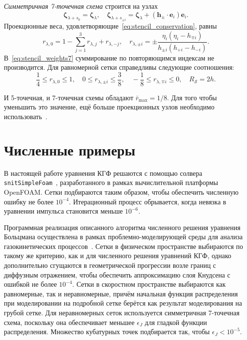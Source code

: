 \documentclass[
aps,%
12pt,%
final,%
notitlepage,%
oneside,%
onecolumn,%
nobibnotes,%
nofootinbib,%
superscriptaddress,%
noshowpacs,%
showkeys,%
centertags]%
{revtex4}
\newcommand{\bzeta}{\boldsymbol{\zeta}}
\newcommand{\bh}{\boldsymbol{h}}
\newcommand{\be}{\boldsymbol{e}}
\begin{document}
\emph{Симметричная 7-точечная схема} строится на узлах
\begin{equation}\label{eq:stencil_nodes7}
    \bzeta_{\lambda+s_0} = \bzeta_{\lambda}, \quad
    \bzeta_{\lambda+s_{\pm i}} = \bzeta_{\lambda} + (\bh_\pm\cdot \be_i)\be_i.
\end{equation}
Проекционные веса, удовлетворяющие~\eqref{eq:stencil_conservation}, равны
\begin{equation}\label{eq:stencil_weights7}
    r_{\lambda,0} = 1 - \sum_{j=1}^3 r_{\lambda,j} + r_{\lambda,-j}, \quad
    r_{\lambda,\pm i} = \pm\frac{\eta_i(\eta_i - h_{\mp i})}{h_{\pm i}(h_{+i}-h_{-i})}.
\end{equation}
В~\eqref{eq:stencil_weights7} суммирование по повторяющимся индексам не производится.
Для равномерной сетки справедливы следующие соотношения:
\begin{equation}\label{eq:weights_ranges7}
    \frac14 \leq r_{\lambda,0} \leq 1, \quad
    0 \leq r_{\lambda,\pm i} \leq \frac38, \quad
    -\frac18 \leq r_{\lambda,\mp i} \leq 0, \quad
    R_\mathcal{S} = 2h.
\end{equation}

И 5-точечная, и 7-точечная схемы обладают \(\bar{r}_{\max}=1/8\).
Для того чтобы уменьшить это значение, ещё больше проекционных узлов необходимо использовать~\citep{Dodulad2012}.

\section{Численные примеры}

В настоящей работе уравнения КГФ решаются с помощью солвера \verb+snitSimpleFoam+~\cite{Rogozin2014},
разработанного в рамках вычислительной платформы OpenFOAM\textregistered{}.
Сетки подбираются таким образом, чтобы обеспечить численную ошибку не более \(10^{-4}\).
Итерационный процесс обрывается, когда невязка в уравнении импульса становится меньше \(10^{-6}\).

Программная реализация описанного алгоритма численного решения уравнения Больцмана
осуществлена в рамках проблемно-моделирующей среды
для анализа газокинетических процессов~\cite{Kloss2011, Kloss2012}.
Сетки в физическом пространстве выбираются по такому же критерию, как и для численного решения уравнений КГФ,
однако дополнительно сгущаются в геометрической прогрессии возле границ с диффузным отражением,
чтобы обеспечить аппроксимацию слоя Кнудсена с ошибкой не более \(10^{-4}\).
Сетки в скоростном пространстве выбираются как равномерные, так и неравномерные,
причём начальная функция распределения при моделировании на подробной сетке берётся
как результат моделирования на грубой сетке.
Для неравномерных сеток используется симметричная 7-точечная схема, поскольку она
обеспечивает меньшее \(\epsilon_J\) для гладкой функции распределения.
Множество кубатурных точек подбирается так, чтобы \(\epsilon_J < 10^{-5}\).
\end{document}
